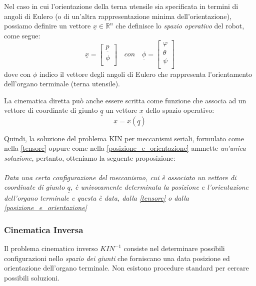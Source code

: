 Nel caso in cui l'orientazione della terna utensile sia specificata in termini di angoli di Eulero (o di un'altra rappresentazione minima dell'orientazione), possiamo definire un vettore $\underline{x}\in\mathbb{R}^n$ che definisce lo \emph{spazio operativo} del robot, come segue:
\begin{equation} \label{posizione_e_orientazione}
	\underline{x} =
	\begin{bmatrix}
		\underline{p} \\
		\phi \\
	\end{bmatrix}
	\quad con \quad
	\underline{\phi} = 
	\begin{bmatrix}
		\varphi \\
		\theta \\
		\psi \\
	\end{bmatrix}
\end{equation}
dove con $\phi$ indico il vettore degli angoli di Eulero che rappresenta l'orientamento dell'organo terminale (terna utensile). 

La cinematica diretta può anche essere scritta come funzione che associa ad un vettore di coordinate di giunto $\underline{q}$ un vettore $\underline{x}$ dello spazio operativo:
\begin{equation}
	\underline{x} = \underline{x}(\underline{q})
\end{equation}

Quindi, la soluzione del problema KIN per meccanismi seriali, formulato come nella \eqref{tensore} oppure come nella \eqref{posizione_e_orientazione} ammette \emph{un'unica soluzione}, pertanto, otteniamo la seguente proposizione:

\paragraph{}
	\emph{Data una certa configurazione del meccanismo, cui è associato un vettore di coordinate di giunto $\underline{q}$, è univocamente determinata la posizione e l'orientazione dell'organo terminale e questa è data, dalla \eqref{tensore} o dalla \eqref{posizione_e_orientazione}}

\subsubsection{Cinematica Inversa}
Il problema cinematico inverso $KIN^{-1}$ consiste nel determinare possibili configurazioni nello \emph{spazio dei giunti} che forniscano una data posizione ed orientazione dell'organo terminale. Non esistono procedure standard per cercare possibili soluzioni.


